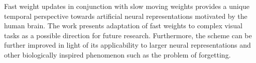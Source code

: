 \documentclass[11pt,letterpaper]{article}
\begin{document}
Fast weight updates in conjunction with slow moving weights provides a unique temporal perspective towards artificial neural representations motivated by the human brain. The work presents adaptation of fast weights to complex visual tasks as a possible direction for future research. Furthermore, the scheme can be further improved in light of its applicability to larger neural representations and other biologically inspired phenomenon such as the problem of forgetting.
\end{document}

